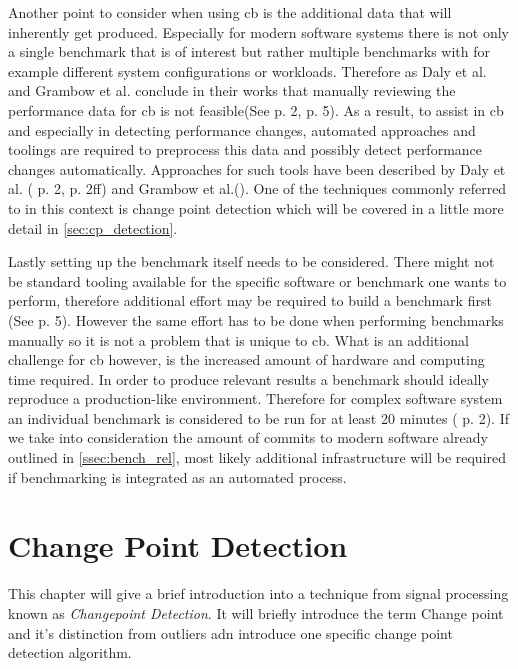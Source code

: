 \documentclass[	runningheads,
				a4paper]{llncs}
\begin{document}
	Another point to consider when using \gls{cb} is the additional data that will inherently get produced. Especially for modern software systems there is not only a single benchmark that is of interest but rather multiple benchmarks with for example different system configurations or workloads. Therefore as Daly et al. and Grambow et al. conclude in their works that manually reviewing the performance data for \gls{cb} is not feasible(See \cite{daly2020} p. 2, \cite{grambow2019} p. 5). As a result, to assist in \gls{cb} and especially in detecting performance changes, automated approaches and toolings are required to preprocess this data and possibly detect performance changes automatically. Approaches for such tools have been described by Daly et al. (\cite{daly2020} p. 2, \cite{daly2021} p. 2ff) and Grambow et al.(\cite{grambow2019}). One of the techniques commonly referred to in this context is change point detection which will be covered in a little more detail in \autoref{sec:cp_detection}.

	Lastly setting up the benchmark itself needs to be considered. There might not be standard tooling available for the specific software or benchmark one wants to perform, therefore additional effort may be required to build a benchmark first (See \cite{grambow2019} p. 5). However the same effort has to be done when performing benchmarks manually so it is not a problem that is unique to \gls{cb}. What is an additional challenge for \gls{cb} however, is the increased amount of hardware and computing time required. In order to produce relevant results a benchmark should ideally reproduce a production-like environment. Therefore for complex software system an individual benchmark is considered to be run for at least 20 minutes (\cite{grambow2019} p. 2). If we take into consideration the amount of commits to modern software already outlined in \autoref{ssec:bench_rel}, most likely additional infrastructure will be required if benchmarking is integrated as an automated process. 

	\section{Change Point Detection}
	\label{sec:cp_detection}
	This chapter will give a brief introduction into a technique from signal processing known as \textit{Changepoint Detection}. It will briefly introduce the term Change point and it's distinction from outliers adn introduce one specific change point detection algorithm. 
	
\end{document}
